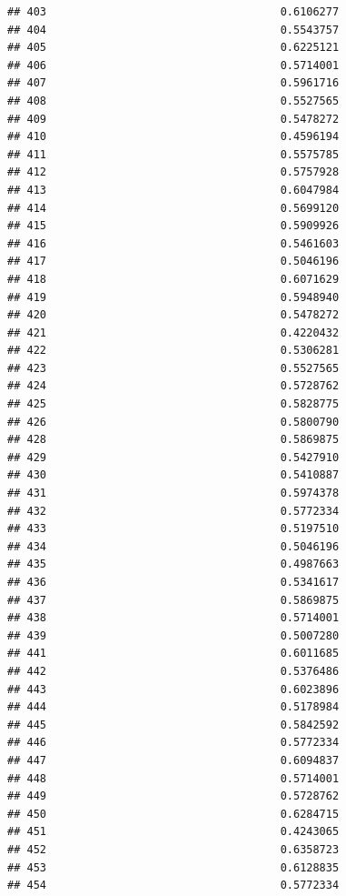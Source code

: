\documentclass[
  american,
  man,floatsintext]{apa7}
\begin{document}
\begin{verbatim}
## 403                                    0.6106277
## 404                                    0.5543757
## 405                                    0.6225121
## 406                                    0.5714001
## 407                                    0.5961716
## 408                                    0.5527565
## 409                                    0.5478272
## 410                                    0.4596194
## 411                                    0.5575785
## 412                                    0.5757928
## 413                                    0.6047984
## 414                                    0.5699120
## 415                                    0.5909926
## 416                                    0.5461603
## 417                                    0.5046196
## 418                                    0.6071629
## 419                                    0.5948940
## 420                                    0.5478272
## 421                                    0.4220432
## 422                                    0.5306281
## 423                                    0.5527565
## 424                                    0.5728762
## 425                                    0.5828775
## 426                                    0.5800790
## 428                                    0.5869875
## 429                                    0.5427910
## 430                                    0.5410887
## 431                                    0.5974378
## 432                                    0.5772334
## 433                                    0.5197510
## 434                                    0.5046196
## 435                                    0.4987663
## 436                                    0.5341617
## 437                                    0.5869875
## 438                                    0.5714001
## 439                                    0.5007280
## 441                                    0.6011685
## 442                                    0.5376486
## 443                                    0.6023896
## 444                                    0.5178984
## 445                                    0.5842592
## 446                                    0.5772334
## 447                                    0.6094837
## 448                                    0.5714001
## 449                                    0.5728762
## 450                                    0.6284715
## 451                                    0.4243065
## 452                                    0.6358723
## 453                                    0.6128835
## 454                                    0.5772334

\end{verbatim}
\end{document}
